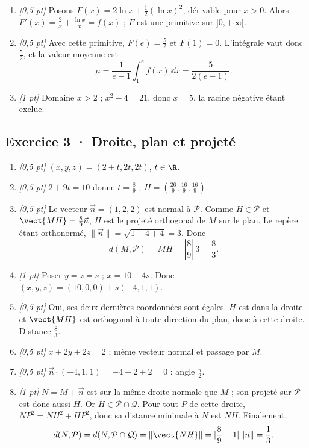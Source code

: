 \begin{enumerate}
\item \textit{[0,5 pt]} Posons $F(x)=2\ln x+\frac12(\ln x)^2$, dérivable pour $x>0$. Alors $F'(x)=\frac{2}{x}+\frac{\ln x}{x}=f(x)$ ; $F$ est une primitive sur $]0,+\infty[$.

\item \textit{[0,5 pt]} Avec cette primitive, $F(e)=\frac{5}{2}$ et $F(1)=0$. L'intégrale vaut donc $\frac{5}{2}$, et la valeur moyenne est
\[\mu=\frac{1}{e-1}\int_1^e f(x)\,\dd x=\frac{5}{2(e-1)}.\]

\item \textit{[1 pt]} Domaine $x>2$ ; $x^2-4=21$, donc $x=5$, la racine négative étant exclue.

\end{enumerate}

\subsection*{Exercice 3 · Droite, plan et projeté}\begin{enumerate}

\item \textit{[0,5 pt]} $(x,y,z)=(2+t,2t,2t)$, $t\in\R$.

\item \textit{[0,5 pt]} $2+9t=10$ donne $t=\frac{8}{9}$ ; $H=(\frac{26}{9},\frac{16}{9},\frac{16}{9})$.

\item \textit{[0,5 pt]} Le vecteur $\vec n=(1,2,2)$ est normal à $\mathcal P$. Comme $H\in\mathcal P$ et $\vect{MH}=\frac{8}{9}\vec n$, $H$ est le projeté orthogonal de $M$ sur le plan. Le repère étant orthonormé, $\|\vec n\|=\sqrt{1+4+4}=3$. Donc
\[d(M,\mathcal P)=MH=|\frac{8}{9}|\,3=\frac{8}{3}.\]

\item \textit{[1 pt]} Poser $y=z=s$ ; $x=10-4s$. Donc $(x,y,z)=(10,0,0)+s(-4,1,1)$.

\item \textit{[0,5 pt]} Oui, ses deux dernières coordonnées sont égales. $H$ est dans la droite et $\vect{MH}$ est orthogonal à toute direction du plan, donc à cette droite. Distance $\frac{8}{3}$.

\item \textit{[0,5 pt]} $x+2y+2z=2$ ; même vecteur normal et passage par $M$.

\item \textit{[0,5 pt]} $\vec n\cdot(-4,1,1)=-4+2+2=0$ : angle $\frac{\pi}{2}$.

\item \textit{[1 pt]} $N=M+\vec n$ est sur la même droite normale que $M$ ; son projeté sur $\mathcal P$ est donc aussi $H$. Or $H\in\mathcal P\cap\mathcal Q$. Pour tout $P$ de cette droite, $NP^2=NH^2+HP^2$, donc sa distance minimale à $N$ est $NH$. Finalement,
\[d(N,\mathcal P)=d(N,\mathcal P\cap\mathcal Q)=\|\vect{NH}\|=|\frac{8}{9}-1|\,\|\vec n\|=\frac{1}{3}.\]

\end{enumerate}

